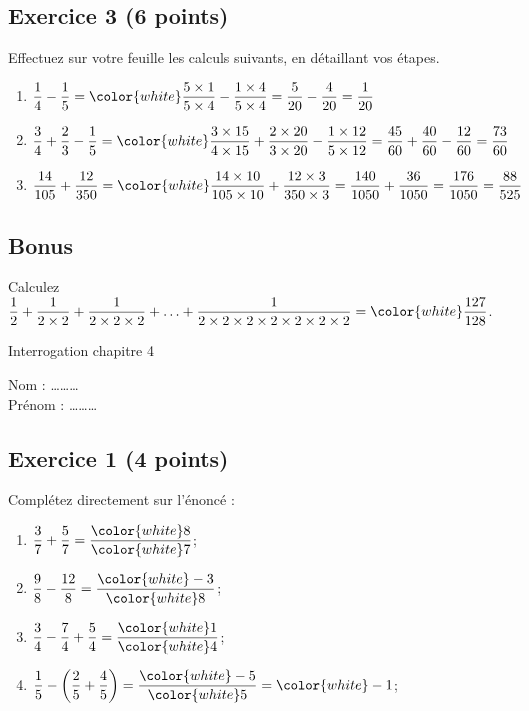 \documentclass[14 pt]{extarticle}
\theoremstyle{plain}
\begin{document}
\subsection*{Exercice 3 (6 points)}

Effectuez sur votre feuille les calculs suivants, en détaillant vos étapes. 

\begin{enumerate}
\item $\displaystyle \frac14 - \frac15 = \color{white} \frac{5\times 1}{5\times4} - \frac{1\times4}{5\times 4} = \frac5{20}-\frac4{20} = \frac1{20}$ 

\item $\displaystyle \frac34 + \frac23 - \frac15
= \color{white} \frac{3\times15}{4\times15} + \frac{2\times20}{3\times 20}- \frac{1\times 12}{5\times12} = \frac{45}{60} + \frac{40}{60} - \frac{12}{60} = \frac{73}{60}$  

\item $\displaystyle \frac{14}{105} + \frac{12}{350} = \color{white} 
\frac{14\times 10}{105\times 10} + \frac{12\times 3}{350\times3} = \frac{140}{1050} + \frac{36}{1050} = \frac{176}{1050} = \frac{88}{525}$ 
\end{enumerate}

\subsection*{Bonus}
Calculez $\displaystyle \frac12 + \frac1{2 \times 2} + \frac1{2\times 2 \times 2} + \ldots + \frac1{2\times 2\times 2 \times 2 \times 2 \times 2 \times 2}= \color{white}\frac{127}{128}$.

\newpage 


\begin{center}{\Large Interrogation chapitre 4}\\ 
 \end{center}
 
 Nom : \ldots\ldots\ldots\\
 Prénom : \ldots\ldots\ldots
 
  \subsection*{Exercice 1 (4 points)}
 Complétez directement sur l'énoncé : 
 \begin{enumerate}
 \item $\displaystyle\frac37 + \frac57 =\frac{\color{white}8}{\color{white}7}$;
 \item $\displaystyle\frac98 - \frac{12}8 = \frac{\color{white}-3}{\color{white}8}$;
 \item $\displaystyle\frac34 - \frac74  + \frac54 = \frac{\color{white}1}{\color{white}4}$;
 \item $\displaystyle\frac15 - \left(\frac25 + \frac45\right) =\frac{\color{white}-5}{\color{white}5} = \color{white} -1$;
 \end{enumerate}
 
\end{document}
